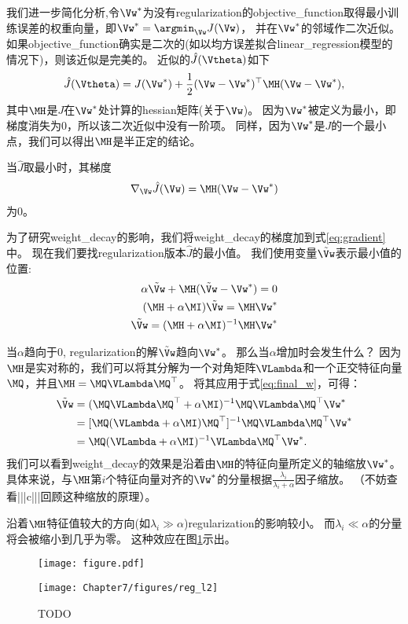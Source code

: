 我们进一步简化分析,令$\Vw^*$为没有\gls{regularization}的\gls{objective_function}取得最小训练误差的权重向量，即$\Vw^* = \argmin_{\Vw} J(\Vw)$， 并在$\Vw^*$的邻域作二次近似。
如果\gls{objective_function}确实是二次的(如以均方误差拟合\gls{linear_regression}模型的情况下)，则该近似是完美的。
近似的$\hat J(\Vtheta)$如下
\begin{align}
 \hat J(\Vtheta) = J(\Vw^*) + \frac{1}{2}(\Vw - \Vw^*)^\top \MH (\Vw - \Vw^*),
\end{align}
其中$\MH$是$J$在$\Vw^*$处计算的\gls{hessian}矩阵(关于$\Vw$)。
因为$\Vw^*$被定义为最小，即梯度消失为0，所以该二次近似中没有一阶项。
同样，因为$\Vw^*$是$J$的一个最小点，我们可以得出$\MH$是半正定的结论。

当$\hat J$取最小时，其梯度
\begin{align}
\label{eq:gradient}
  \nabla_{\Vw} \hat{J}(\Vw) = \MH (\Vw - \Vw^*)
\end{align}
为0。

为了研究\gls{weight_decay}的影响，我们将\gls{weight_decay}的梯度加到式\ref{eq:gradient}中。 
现在我们要找\gls{regularization}版本$\hat J$的最小值。
我们使用变量$\tilde{\Vw}$表示最小值的位置:
\begin{align}
 \alpha \tilde{\Vw} + \MH (\tilde{\Vw} - \Vw^*) = 0 \\
 (\MH + \alpha \MI) \tilde{\Vw} = \MH \Vw^* \\
 \tilde{\Vw} = (\MH + \alpha \MI)^{-1} \MH \Vw^* \label{eq:final_w}
 \end{align}

当$\alpha$趋向于0, \gls{regularization}的解$\tilde{\Vw}$趋向$\Vw^*$。 
那么当$\alpha$增加时会发生什么？
因为$\MH$是实对称的，我们可以将其分解为一个对角矩阵$\VLambda$和一个正交特征向量$\MQ$，并且$\MH = \MQ \VLambda \MQ^\top$。
将其应用于式\ref{eq:final_w}，可得：
\begin{align}
 \tilde \Vw &= ( \MQ \VLambda \MQ^\top + \alpha \MI)^{-1} \MQ \VLambda \MQ^\top \Vw^* \\
                 &=  [ \MQ( \VLambda+ \alpha \MI)  \MQ^\top ]^{-1} \MQ \VLambda \MQ^\top \Vw^* \\
                 &= \MQ( \VLambda+ \alpha \MI)^{-1} \VLambda \MQ^\top \Vw^*. \label{eq:713L2}
\end{align}
我们可以看到\gls{weight_decay}的效果是沿着由$\MH$的特征向量所定义的轴缩放$\Vw^*$。
具体来说，与$\MH$第$i$个特征向量对齐的$\Vw^*$的分量根据$\frac{\lambda_i}{\lambda_i + \alpha}$因子缩放。
（不妨查看|||c|||回顾这种缩放的原理）。

沿着$\MH$特征值较大的方向(如$\lambda_i \gg \alpha$)\gls{regularization}的影响较小。
而$\lambda_i \ll \alpha$的分量将会被缩小到几乎为零。
这种效应在图\ref{fig:chap7_reg_l2}示出。
\begin{figure}[!htb]
\ifOpenSource
\centerline{\texttt{[image: figure.pdf]}}
\else
\centerline{\texttt{[image: Chapter7/figures/reg\_l2]}}
\fi
\caption{TODO}
\label{fig:chap7_reg_l2}
\end{figure}


